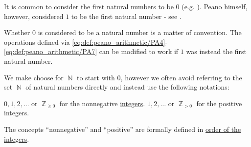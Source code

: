 \begin{remark}\label{rem:peano_arithmetic_zero}
  It is common to consider the first natural numbers to be \( 0 \) (e.g. \cite[exmpl. 17.6]{OpenLogicFull}). Peano himself, however, considered \( 1 \) to be the first natural number - see \cite[1]{Peano1889}.

  Whether \( 0 \) is considered to be a natural number is a matter of convention. The operations defined via \eqref{eq:def:peano_arithmetic/PA4}-\eqref{eq:def:peano_arithmetic/PA7} can be modified to work if \( 1 \) was instead the first natural number.

  We make choose for \( \BbbN \) to start with \( 0 \), however we often avoid referring to the set \( \BbbN \) of natural numbers directly and instead use the following notations:
  \begin{thmenum}
     \( 0, 1, 2, \ldots \) or \( \BbbZ_{\geq 0} \) for the nonnegative \hyperref[def:set_of_integers]{integers}.
     \( 1, 2, \ldots \) or \( \BbbZ_{> 0} \) for the positive integers.
  \end{thmenum}

  The concepts \enquote{nonnegative} and \enquote{positive} are formally defined in \hyperref[def:set_of_integers/order]{order of the integers}.
\end{remark}

